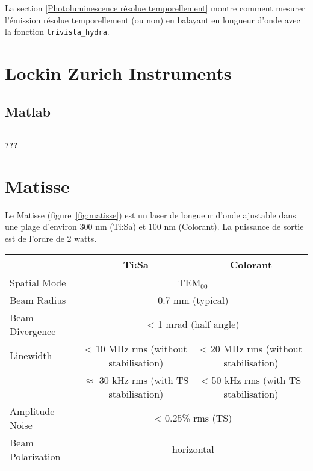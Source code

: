 \documentclass[11pt,francais]{book} %
\begin{document}
La section \ref{Photoluminescence résolue temporellement} montre comment mesurer l'émission résolue temporellement (ou non) en balayant en longueur d'onde avec la fonction \lstinline{trivista_hydra}.


\section{Lockin Zurich Instruments}

\subsection{Matlab}

\begin{lstlisting}[frame=single,caption={Exemple d'utilisation du lockin Surich Instruments avec Matlab},label={lst:exlockinzi},breaklines=true,]  % Start your code-block
  
???
\end{lstlisting}


\section{Matisse}

Le Matisse (figure~\ref{fig:matisse}) est un laser de longueur d'onde ajustable dans une plage d'environ 300 nm (Ti:Sa) et 100 nm (Colorant).
La puissance de sortie est de l'ordre de 2 watts.

\begin{table}[htbp]
  \centering
  \begin{tabular}{lcc}
                    & Ti:Sa       & Colorant \\
    \hline
    Spatial Mode    &	\multicolumn{2}{c}{TEM$_{00}$} \\
    Beam Radius     &  \multicolumn{2}{c}{0.7 mm (typical)}  \\
    Beam Divergence & 	\multicolumn{2}{c}{< 1 mrad (half angle)} \\
    Linewidth       & 	< 10 MHz rms (without stabilisation) & < 20 MHz rms (without stabilisation)\\
    & 	$\approx$ 30 kHz rms (with TS stabilisation) & 	< 50 kHz rms (with TS stabilisation) \\
    Amplitude Noise &  	\multicolumn{2}{c}{< 0.25\% rms (TS)}\\
    Beam Polarization & 	\multicolumn{2}{c}{horizontal} \\
  \end{tabular}
  \label{tab:matisseGeneralCharacteristics}
\end{table}
\end{document}
